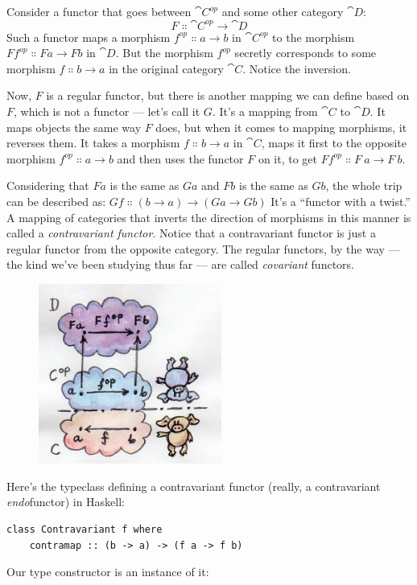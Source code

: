 Consider a functor that goes between $\cat{C}^{op}$ and
some other category $\cat{D}$:
\[F \Colon \cat{C}^{op} \to \cat{D}\]
Such a functor maps a morphism $f^{op} \Colon a \to b$ in
$\cat{C}^{op}$ to the morphism $F f^{op} \Colon F a \to F b$ in $\cat{D}$. But the morphism
$f^{op}$ secretly corresponds to some morphism
$f \Colon b \to a$ in the original category $\cat{C}$. Notice the
inversion.

Now, $F$ is a regular functor, but there is another mapping we can
define based on $F$, which is not a functor --- let's call it
$G$. It's a mapping from $\cat{C}$ to $\cat{D}$. It maps objects the
same way $F$ does, but when it comes to mapping morphisms, it
reverses them. It takes a morphism $f \Colon b \to a$ in $\cat{C}$, maps
it first to the opposite morphism $f^{op} \Colon a \to b$
and then uses the functor $F$ on it, to get $F f^{op} \Colon F\ a \to F\ b$.

Considering that $F a$ is the same as $G a$ and $F b$ is
the same as $G b$, the whole trip can be described as: $G f \Colon (b \to a) \to (G a \to G b)$
It's a ``functor with a twist.'' A mapping of categories that inverts
the direction of morphisms in this manner is called a
\emph{contravariant functor}. Notice that a contravariant functor is
just a regular functor from the opposite category. The regular functors,
by the way --- the kind we've been studying thus far --- are called
\emph{covariant} functors.

\begin{figure}[H]
\centering
\includegraphics[width=60mm]{images/contravariant.jpg}
\end{figure}

\noindent
Here's the typeclass defining a contravariant functor (really, a
contravariant \emph{endo}functor) in Haskell:

\begin{Verbatim}
class Contravariant f where
    contramap :: (b -> a) -> (f a -> f b)
\end{Verbatim}
Our type constructor  is an instance of it:


